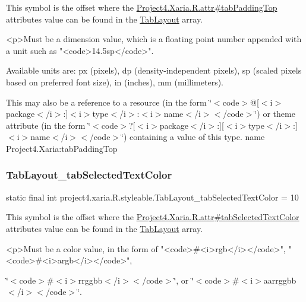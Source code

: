 This symbol is the offset where the \hyperlink{}{Project4.\+Xaria.\+R.\+attr\#tab\+Padding\+Top} attribute\textquotesingle{}s value can be found in the \hyperlink{classproject4_1_1xaria_1_1R_1_1styleable_ab6bfb1f97ae9fba16f4f90d50871d4a8}{Tab\+Layout} array.

\begin{DoxyVerb}      <p>Must be a dimension value, which is a floating point number appended with a unit such as "<code>14.5sp</code>".
\end{DoxyVerb}
 Available units are\+: px (pixels), dp (density-\/independent pixels), sp (scaled pixels based on preferred font size), in (inches), mm (millimeters). 

This may also be a reference to a resource (in the form \char`\"{}$<$code$>$@\mbox{[}$<$i$>$package$<$/i$>$\+:\mbox{]}$<$i$>$type$<$/i$>$\+:$<$i$>$name$<$/i$>$$<$/code$>$\char`\"{}) or theme attribute (in the form \char`\"{}$<$code$>$?\mbox{[}$<$i$>$package$<$/i$>$\+:\mbox{]}\mbox{[}$<$i$>$type$<$/i$>$\+:\mbox{]}$<$i$>$name$<$/i$>$$<$/code$>$\char`\"{}) containing a value of this type.  name Project4.\+Xaria\+:tab\+Padding\+Top \mbox{\label{classproject4_1_1xaria_1_1R_1_1styleable_a6712e8d9a5755a29fa64dfcc525d7652}} 
\subsubsection{\texorpdfstring{Tab\+Layout\+\_\+tab\+Selected\+Text\+Color}{TabLayout\_tabSelectedTextColor}}
{\footnotesize\ttfamily static final int project4.\+xaria.\+R.\+styleable.\+Tab\+Layout\+\_\+tab\+Selected\+Text\+Color = 10\hspace{0.3cm}{\ttfamily [static]}}

This symbol is the offset where the \hyperlink{}{Project4.\+Xaria.\+R.\+attr\#tab\+Selected\+Text\+Color} attribute\textquotesingle{}s value can be found in the \hyperlink{classproject4_1_1xaria_1_1R_1_1styleable_ab6bfb1f97ae9fba16f4f90d50871d4a8}{Tab\+Layout} array.

\begin{DoxyVerb}      <p>Must be a color value, in the form of "<code>#<i>rgb</i></code>", "<code>#<i>argb</i></code>",
\end{DoxyVerb}
 \char`\"{}$<$code$>$\#$<$i$>$rrggbb$<$/i$>$$<$/code$>$\char`\"{}, or \char`\"{}$<$code$>$\#$<$i$>$aarrggbb$<$/i$>$$<$/code$>$\char`\"{}. 

